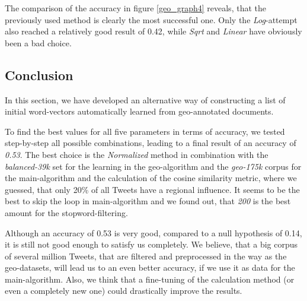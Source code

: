 \documentclass[../Main.tex]{subfiles}
\begin{document}
The comparison of the accuracy in figure \ref{geo_graph4} reveals, that the previously used method is clearly the most successful one. Only the \emph{Log}-attempt also reached a relatively good result of 0.42, while \emph{Sqrt} and \emph{Linear} have obviously been a bad choice. 

\subsection{Conclusion}
In this section, we have developed an alternative way of constructing a list of initial word-vectors automatically learned from geo-annotated documents. 

To find the best values for all five parameters in terms of accuracy, we tested step-by-step all possible combinations,  leading to a final result of an accuracy of \emph{0.53}. The best choice is the \emph{Normalized} method in combination with the \emph{balanced-39k} set for the learning in the geo-algorithm and the \emph{geo-175k} corpus  for the main-algorithm and the calculation of the cosine similarity metric, where we guessed, that only 20\% of all Tweets have a regional influence. It seems to be the best to skip the loop in main-algorithm and we found out, that \emph{200} is the best amount for the stopword-filtering.
 
Although an accuracy of 0.53 is very good, compared to a null hypothesis of 0.14, it is still not good enough to satisfy us completely. We believe, that a big corpus of several million Tweets, that are filtered and preprocessed in the way as the geo-datasets, will lead us to an even better accuracy, if we use it as data for the main-algorithm. Also, we think that a fine-tuning of the calculation method (or even a completely new one) could drastically improve the results. 
\end{document}
